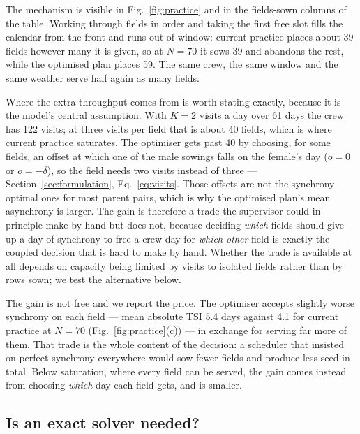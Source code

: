 \documentclass[10pt,twocolumn]{article}
\begin{document}
The mechanism is visible in Fig.~\ref{fig:practice} and in the
fields-sown columns of the table. Working through fields in order and
taking the first free slot fills the calendar from the front and runs
out of window: current practice places about 39 fields
however many it is given, so at $N = 70$ it sows
39 and abandons the rest, while the
optimised plan places 59. The
same crew, the same window and the same weather serve half again as
many fields.

Where the extra throughput comes from is worth stating exactly,
because it is the model's central assumption. With $K = 2$ visits a day
over 61 days the crew has 122 visits; at three visits per field that
is about 40 fields, which is where current practice saturates. The
optimiser gets past 40 by choosing, for some fields, an offset at which
one of the male sowings falls on the female's day ($o = 0$ or
$o = -\delta$), so the field needs two visits instead of three ---
Section~\ref{sec:formulation}, Eq.~\eqref{eq:visits}. Those offsets
are not the synchrony-optimal ones for most parent pairs, which is
why the optimised plan's mean asynchrony is larger. The gain is
therefore a trade the supervisor could in principle make by hand but
does not, because deciding \emph{which} fields should give up a day
of synchrony to free a crew-day for \emph{which other} field is
exactly the coupled decision that is hard to make by hand. Whether
the trade is available at all depends on capacity being limited by
visits to isolated fields rather than by rows sown; we test the
alternative below.

The gain is not free and we report the price. The optimiser accepts
slightly worse synchrony on each field --- mean absolute TSI
5.4 days against
4.1 for current practice at
$N = 70$ (Fig.~\ref{fig:practice}(c)) --- in exchange for
serving far more of them. That trade is the whole content of the
decision: a scheduler that insisted on perfect synchrony everywhere
would sow fewer fields and produce less seed in total. Below
saturation, where every field can be served, the gain comes instead
from choosing \emph{which} day each field gets, and is smaller.

\subsection{Is an exact solver needed?}
\end{document}
